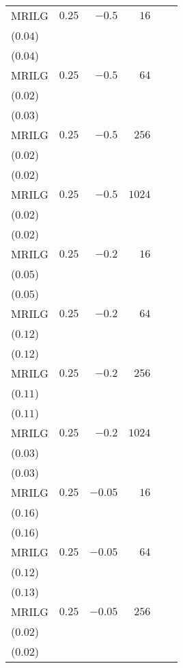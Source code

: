 \begin{table}[t]
\begin{tabular}{lrrrrr}
MRILG & \(0.25\) & \(-0.5\) & \(16\) & \longcell{\(0.43\)\\{\tiny(\(0.04\))}} & \longcell{\(0.44\)\\{\tiny(\(0.04\))}} \\[2.2ex]
MRILG & \(0.25\) & \(-0.5\) & \(64\) & \longcell{\(0.37\)\\{\tiny(\(0.02\))}} & \longcell{\(0.38\)\\{\tiny(\(0.03\))}} \\[2.2ex]
MRILG & \(0.25\) & \(-0.5\) & \(256\) & \longcell{\(0.35\)\\{\tiny(\(0.02\))}} & \longcell{\(0.36\)\\{\tiny(\(0.02\))}} \\[2.2ex]
MRILG & \(0.25\) & \(-0.5\) & \(1024\) & \longcell{\(0.31\)\\{\tiny(\(0.02\))}} & \longcell{\(0.32\)\\{\tiny(\(0.02\))}} \\[2.2ex]
MRILG & \(0.25\) & \(-0.2\) & \(16\) & \longcell{\(0.45\)\\{\tiny(\(0.05\))}} & \longcell{\(0.46\)\\{\tiny(\(0.05\))}} \\[2.2ex]
MRILG & \(0.25\) & \(-0.2\) & \(64\) & \longcell{\(0.37\)\\{\tiny(\(0.12\))}} & \longcell{\(0.38\)\\{\tiny(\(0.12\))}} \\[2.2ex]
MRILG & \(0.25\) & \(-0.2\) & \(256\) & \longcell{\(0.31\)\\{\tiny(\(0.11\))}} & \longcell{\(0.31\)\\{\tiny(\(0.11\))}} \\[2.2ex]
MRILG & \(0.25\) & \(-0.2\) & \(1024\) & \longcell{\(0.32\)\\{\tiny(\(0.03\))}} & \longcell{\(0.33\)\\{\tiny(\(0.03\))}} \\[2.2ex]
MRILG & \(0.25\) & \(-0.05\) & \(16\) & \longcell{\(0.43\)\\{\tiny(\(0.16\))}} & \longcell{\(0.44\)\\{\tiny(\(0.16\))}} \\[2.2ex]
MRILG & \(0.25\) & \(-0.05\) & \(64\) & \longcell{\(0.34\)\\{\tiny(\(0.12\))}} & \longcell{\(0.34\)\\{\tiny(\(0.13\))}} \\[2.2ex]
MRILG & \(0.25\) & \(-0.05\) & \(256\) & \longcell{\(0.34\)\\{\tiny(\(0.02\))}} & \longcell{\(0.36\)\\{\tiny(\(0.02\))}} \\[2.2ex]

\end{tabular}
\end{table}

